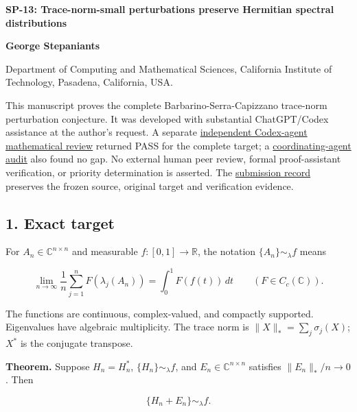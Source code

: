 \documentclass[10pt,a4paper]{article}
\begin{document}
{\raggedright\Large\bfseries SP-13: Trace-norm-small perturbations
preserve Hermitian spectral distributions\par}
\vspace{0.4em}
{\normalsize\bfseries George Stepaniants\par}
{\small Department of Computing and Mathematical Sciences, California
Institute of Technology, Pasadena, California, USA.\par}
\vspace{0.6em}
\pagestyle{plain}

This manuscript proves the complete Barbarino-Serra-Capizzano trace-norm
perturbation conjecture. It was developed with substantial ChatGPT/Codex
assistance at the author's request. A separate
\href{https://github.com/ajt60gaibb/OpenProblemsInNLA/blob/main/references/stepaniants-sp13-2026-09-11/verification/SP-13-independent-review.md}{independent
Codex-agent mathematical review} returned PASS for the complete target;
a
\href{https://github.com/ajt60gaibb/OpenProblemsInNLA/blob/main/references/stepaniants-sp13-2026-09-11/verification/SP-13-root-math-review.md}{coordinating-agent
audit} also found no gap. No external human peer review, formal
proof-assistant verification, or priority determination is asserted. The
\href{https://github.com/ajt60gaibb/OpenProblemsInNLA/blob/main/references/stepaniants-sp13-2026-09-11/README.md}{submission
record} preserves the frozen source, original target and verification
evidence.

\subsection{1. Exact target}\label{exact-target}

For \(A_n\in\mathbb C^{n\times n}\) and measurable
\(f:[0,1]\to\mathbb R\), the notation \(\{A_n\}\sim_\lambda f\) means

\[\lim_{n\to\infty}\frac1n\sum_{j=1}^n F(\lambda_j(A_n))
=\int_0^1 F(f(t))\,dt\qquad(F\in C_c(\mathbb C)).\]

The functions are continuous, complex-valued, and compactly supported.
Eigenvalues have algebraic multiplicity. The trace norm is
\(\|X\|_* = \sum_j\sigma_j(X)\); \(X^*\) is the conjugate transpose.

\textbf{Theorem.} Suppose \(H_n=H_n^*\), \(\{H_n\}\sim_\lambda f\), and
\(E_n\in\mathbb C^{n\times n}\) satisfies \(\|E_n\|_*/n\to0\). Then

\[\{H_n+E_n\}\sim_\lambda f.\]
\end{document}
